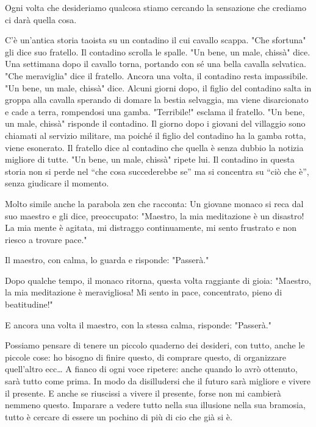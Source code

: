 \documentclass[12pt]{book} %
\begin{document}
\begin{mdframed}[linewidth=1pt]
Ogni volta che desideriamo qualcosa stiamo cercando la sensazione che crediamo ci darà quella cosa. 

C'è un'antica storia taoista su un contadino il cui cavallo scappa.
"Che sfortuna" gli dice suo fratello. Il contadino scrolla le spalle.
"Un bene, un male, chissà" dice. Una settimana dopo il cavallo torna,
portando con sé una bella cavalla selvatica. "Che meraviglia" dice il
fratello. Ancora una volta, il contadino resta impassibile. "Un bene, un male,
chissà" dice. Alcuni giorni dopo, il figlio del contadino salta in groppa alla cavalla sperando di
domare la bestia selvaggia, ma viene disarcionato e cade a terra, rompendosi una gamba.
"Terribile!" esclama il fratello. "Un bene, un male,
chissà" risponde il contadino. Il giorno dopo i giovani del villaggio sono chiamati al servizio
militare, ma poiché il figlio del contadino ha la gamba rotta, viene esonerato. Il fratello dice al contadino che
quella è senza dubbio la notizia migliore di tutte. "Un bene, un male,
chissà" ripete lui. Il contadino in questa storia non si perde nel “che cosa succederebbe se” ma
si concentra su “ciò che è”, senza giudicare il momento.

Molto simile anche la parabola zen che racconta:
Un giovane monaco si reca dal suo maestro e gli dice, preoccupato:
"Maestro, la mia meditazione è un disastro! La mia mente è agitata, mi distraggo continuamente, mi sento frustrato e non riesco a trovare pace."

Il maestro, con calma, lo guarda e risponde:
"Passerà."

Dopo qualche tempo, il monaco ritorna, questa volta raggiante di gioia:
"Maestro, la mia meditazione è meravigliosa! Mi sento in pace, concentrato, pieno di beatitudine!"

E ancora una volta il maestro, con la stessa calma, risponde:
"Passerà."

\bigskip
\bigskip

Possiamo pensare di tenere un piccolo quaderno dei desideri, con tutto, anche le piccole cose:
ho bisogno di finire questo, di comprare questo, di organizzare quell'altro ecc…
A fianco di ogni voce ripetere: anche quando lo avrò ottenuto, sarà tutto come prima.
In modo da disilludersi che il futuro sarà migliore e vivere il presente.
E anche se riuscissi a vivere il presente, forse non mi cambierà nemmeno questo.
Imparare a vedere tutto nella sua illusione nella sua bramosia, tutto è cercare di essere un pochino di più di cio che già si è.


\end{mdframed}
\end{document}
